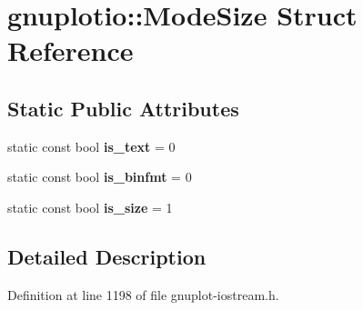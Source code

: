 \hypertarget{structgnuplotio_1_1_mode_size}{}\section{gnuplotio\+:\+:Mode\+Size Struct Reference}
\label{structgnuplotio_1_1_mode_size}
\subsection*{Static Public Attributes}
\begin{DoxyCompactItemize}
\item 
static const bool {\bfseries is\+\_\+text} = 0\hypertarget{structgnuplotio_1_1_mode_size_aa01840f76877ae7c8bad254dae28e32c}{}\label{structgnuplotio_1_1_mode_size_aa01840f76877ae7c8bad254dae28e32c}

\item 
static const bool {\bfseries is\+\_\+binfmt} = 0\hypertarget{structgnuplotio_1_1_mode_size_ac5243e8e4910f2f6a2724b9fc0de4ff9}{}\label{structgnuplotio_1_1_mode_size_ac5243e8e4910f2f6a2724b9fc0de4ff9}

\item 
static const bool {\bfseries is\+\_\+size} = 1\hypertarget{structgnuplotio_1_1_mode_size_aa20ae9f1ce222504489db33d13eb46c0}{}\label{structgnuplotio_1_1_mode_size_aa20ae9f1ce222504489db33d13eb46c0}

\end{DoxyCompactItemize}


\subsection{Detailed Description}


Definition at line 1198 of file gnuplot-\/iostream.\+h.


